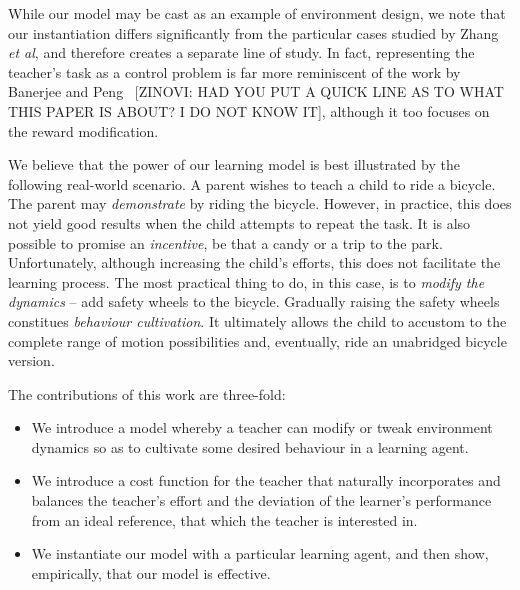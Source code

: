 While our model may be cast as an example of environment design, we
note that our instantiation differs significantly from the particular
cases studied by Zhang \emph{et al}, and therefore creates a separate
line of study. In fact, representing the teacher's task as a control
problem is far more reminiscent of the work by Banerjee and
Peng~\cite{banerjee_peng_2005} [ZINOVI: HAD YOU PUT A QUICK LINE AS TO WHAT THIS PAPER IS ABOUT? I DO NOT KNOW IT], although it too focuses on the reward
modification.

We believe that the power of our learning model is best illustrated by the following real-world scenario. A
parent wishes to teach a child to ride a bicycle. The parent may {\em
  demonstrate} by riding the bicycle. However, in practice, this does
not yield good results when the child attempts to repeat the task. It
is also possible to promise an {\em incentive}, be that a candy or a
trip to the park. Unfortunately, although increasing the child's
efforts, this does not facilitate the learning process. The most
practical thing to do, in this case, is to {\em modify the dynamics} --
add safety wheels to the bicycle. Gradually raising the safety wheels
constitues {\em behaviour cultivation}. It ultimately allows the child
to accustom to the complete range of motion possibilities and,
eventually, ride an unabridged bicycle version.

The contributions of this work are three-fold:
\begin{itemize}
\item We introduce a model whereby a teacher can modify or tweak environment dynamics so as to cultivate some desired behaviour in a learning agent.
\item We introduce a  cost function for the teacher that
naturally incorporates and balances the teacher's
effort and the deviation of the learner's performance from an ideal
reference, that which the teacher is interested in.
\item We instantiate our model with a particular learning agent, and then show, empirically, that our model  is effective.
\end{itemize}


